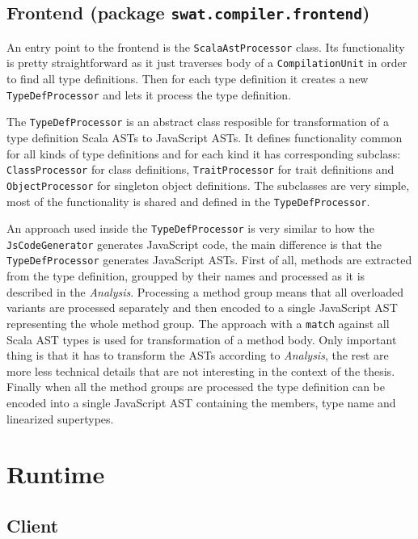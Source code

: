 \documentclass[12pt,a4paper]{report}
\begin{document}
\subsection{Frontend (package \texttt{swat.compiler.frontend})}

An entry point to the frontend is the \texttt{ScalaAstProcessor} class. Its functionality is pretty straightforward as it just traverses body of a \texttt{CompilationUnit} in order to find all type definitions. Then for each type definition it creates a new \texttt{TypeDefProcessor} and lets it process the type definition.

The \texttt{TypeDefProcessor} is an abstract class resposible for transformation of a type definition Scala ASTs to JavaScript ASTs. It defines functionality common for all kinds of type definitions and for each kind it has corresponding subclass: \texttt{ClassProcessor} for class definitions, \texttt{TraitProcessor} for trait definitions and \texttt{ObjectProcessor} for singleton object definitions. The subclasses are very simple, most of the functionality is shared and defined in the \texttt{TypeDefProcessor}.

An approach used inside the \texttt{TypeDefProcessor} is very similar to how the \texttt{JsCodeGenerator} generates JavaScript code, the main difference is that the \texttt{TypeDefProcessor} generates JavaScript ASTs. First of all, methods are extracted from the type definition, groupped by their names and processed as it is described in the {\it Analysis}. Processing a method group means that all overloaded variants are processed separately and then encoded to a single JavaScript AST representing the whole method group. The approach with a \texttt{match} against all Scala AST types is used for transformation of a method body. Only important thing is that it has to transform the ASTs according to {\it Analysis}, the rest are more less technical details that are not interesting in the context of the thesis. Finally when all the method groups are processed the type definition can be encoded into a single JavaScript AST containing the members, type name and linearized supertypes.


\section{Runtime}

\subsection{Client}
\end{document}
